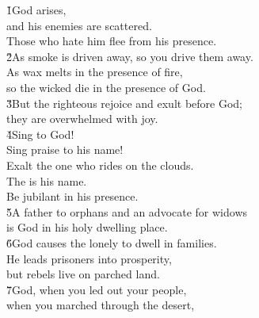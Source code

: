 \begin{poetry}
\poeml \v{1}God arises, \\
\poemll    and his enemies are scattered. \\
\poemlll       Those who hate him flee from his presence. \\
\poeml \v{2}As smoke is driven away, so you drive them away. \\
\poemll    As wax melts in the presence of fire, \\
\poemlll       so the wicked die in the presence of God. \\
\poeml \v{3}But the righteous rejoice and exult before God; \\
\poemll    they are overwhelmed with joy. \\
\poeml \v{4}Sing to God! \\
\poemll    Sing praise to his name! \\
\poemlll       Exalt the one who rides on the clouds. \\
\poeml The  is his name. \\
\poemll    Be jubilant in his presence. \\
\poeml \v{5}A father to orphans and an advocate for widows \\
\poemll    is God in his holy dwelling place. \\
\poeml \v{6}God causes the lonely to dwell in families. \\
\poemll    He leads prisoners into prosperity, \\
\poemlll       but rebels live on parched land. \\
\poeml \v{7}God, when you led out your people, \\
\poemll    when you marched through the desert,
\end{poetry}

